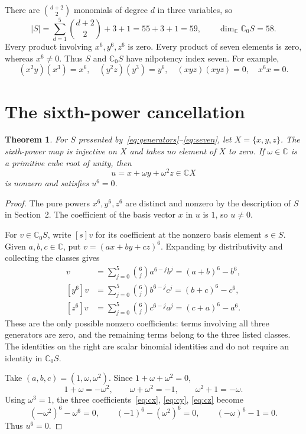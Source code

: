 \documentclass[11pt]{article}
\newtheorem{theorem}{Theorem}
\newcommand{\C}{\mathbb C}
\begin{document}
There are $\binom{d+2}{2}$ monomials of degree $d$ in three variables, so
\[
|S|=\sum_{d=1}^5\binom{d+2}{2}+3+1=55+3+1=59,
\qquad \dim_{\C}\C_0S=58.
\]
Every product involving $x^6,y^6,z^6$ is zero. Every product of seven
elements is zero, whereas $x^6\ne0$. Thus $S$ and $\C_0S$ have nilpotency
index seven.
For example,
\[
(x^2y)(x^3)=x^6,\quad (y^2z)(y^3)=y^6,\quad
(xyz)(xyz)=0,\quad x^6x=0.
\]

\section{The sixth-power cancellation}
\begin{theorem}\label{thm:answer}
For $S$ presented by~\eqref{eq:generators}--\eqref{eq:seven}, let
$X=\{x,y,z\}$. The sixth-power map is injective on $X$ and takes no element
of $X$ to zero. If $\omega\in\C$ is a primitive cube root of unity, then
\[
u=x+\omega y+\omega^2z\in\C X
\]
is nonzero and satisfies $u^6=0$.
\end{theorem}
\begin{proof}
The pure powers $x^6,y^6,z^6$ are distinct and nonzero by the description
of $S$ in Section~2. The coefficient of the basis vector $x$ in $u$
is $1$, so $u\ne0$.

For $v\in\C_0S$, write $[s]v$ for its coefficient at the nonzero basis
element $s\in S$. Given $a,b,c\in\C$, put $v=(ax+by+cz)^6$. Expanding
by distributivity and collecting the classes gives
\begin{align}
[x^6]v&=\sum_{j=0}^5\binom6j a^{6-j}b^j=(a+b)^6-b^6,\label{eq:cx}\\
[y^6]v&=\sum_{j=0}^5\binom6j b^{6-j}c^j=(b+c)^6-c^6,\label{eq:cy}\\
[z^6]v&=\sum_{j=0}^5\binom6j c^{6-j}a^j=(c+a)^6-a^6.\label{eq:cz}
\end{align}
These are the only possible nonzero coefficients: terms involving all
three generators are zero, and the remaining terms belong to the three
listed classes. The identities on the right are scalar binomial identities
and do not require an identity in $\C_0S$.

Take $(a,b,c)=(1,\omega,\omega^2)$. Since $1+\omega+\omega^2=0$,
\[
1+\omega=-\omega^2,\qquad \omega+\omega^2=-1,
\qquad \omega^2+1=-\omega.
\]
Using $\omega^3=1$, the three coefficients~\eqref{eq:cx}, \eqref{eq:cy}, \eqref{eq:cz} become
\[
(-\omega^2)^6-\omega^6=0,\qquad
(-1)^6-(\omega^2)^6=0,\qquad
(-\omega)^6-1=0.
\]
Thus $u^6=0$.
\end{proof}
\end{document}
